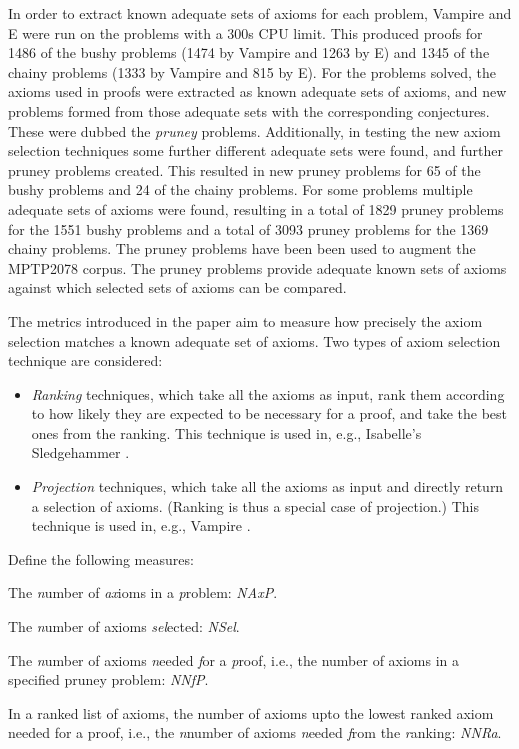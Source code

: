 \documentclass[EPiC]{easychair}
\newenvironment{packed_itemize}{
\vspace*{-0.5em}
\begin{itemize}
  \setlength{\partopsep}{0pt}
  \setlength{\itemsep}{1pt}
  \setlength{\parskip}{0pt}
  \setlength{\parsep}{0pt}
}{\end{itemize}}
\begin{document}
In order to extract known adequate sets of axioms for each problem, Vampire
and E were run on the problems with a 300s CPU limit.
This produced proofs for 1486 of the bushy problems (1474 by Vampire and 1263
by E) and 1345 of the chainy problems (1333 by Vampire and 815 by E).
For the problems solved, the axioms used in proofs were extracted as
known adequate sets of axioms, and new problems formed from those adequate
sets with the corresponding conjectures.
These were dubbed the \emph{pruney} problems.
Additionally, in testing the new axiom selection techniques some further
different adequate sets were found, and further pruney problems created.
This resulted in new pruney problems for 65 of the bushy problems and
24 of the chainy problems.
For some problems multiple adequate sets of axioms were found, resulting in
a total of 1829 pruney problems for the 1551 bushy problems and a total of
3093 pruney problems for the 1369 chainy problems.
The pruney problems have been been used to augment the MPTP2078 corpus.
The pruney problems provide adequate known sets of axioms against which
selected sets of axioms can be compared.

The metrics introduced in the paper aim to measure how precisely the
axiom selection matches a known adequate set of axioms.
Two types of axiom selection technique are considered:
\begin{itemize}
\item \emph{Ranking} techniques, which take all the axioms as input, rank them
      according to how likely they are expected to be necessary for a proof,
      and take the best ones from the ranking.
      This technique is used in, e.g., Isabelle's Sledgehammer \cite{PB10}.
\item \emph{Projection} techniques, which take all the axioms as input and
      directly return a selection of axioms.
      (Ranking is thus a special case of projection.)
      This technique is used in, e.g., Vampire \cite{HV11}.
\end{itemize}

Define the following measures:
\begin{packed_itemize}
\item The \emph{n}umber of \emph{ax}ioms in a \emph{p}roblem: \emph{NAxP}.
\item The \emph{n}umber of axioms \emph{sel}ected: \emph{NSel}.
\item The \emph{n}umber of axioms \emph{n}eeded \emph{f}or a \emph{p}roof, i.e., 
      the number of axioms in a specified pruney problem: \emph{NNfP}.
\item In a ranked list of axioms, the number of axioms upto the lowest ranked
      axiom needed for a proof, i.e., the \emph{n}number of axioms
      \emph{n}eeded \emph{f}rom the \emph{r}anking: \emph{NNRa}.
\item
\end{packed_itemize}
\end{document}
